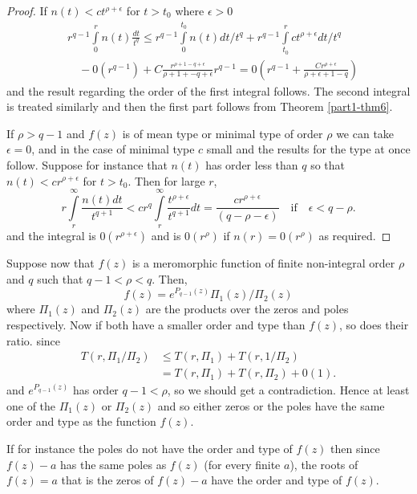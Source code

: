 \begin{proof}
If $n(t)<ct^{\rho+\epsilon}$ for $t> t_0$ where $\epsilon>0$
\begin{align*}
& r^{q-1}\int\limits^{r}_{0}n(t)\frac{dt}{t^{q}}\leq
  r^{q-1}\int\limits^{t_{0}}_{0}n(t)dt/t^{q}+r^{q-1}\int\limits^{r}_{t_{0}}ct^{\rho+\epsilon}dt/t^{q}\\
&\quad
  -0(r^{q-1})+C\frac{r^{\rho+1-q+\epsilon}}{\rho+1+-q+\epsilon}r^{q-1}=0\left(r^{q-1}+\frac{Cr^{\rho+\epsilon}}{\rho+\epsilon+1-q}\right)
\end{align*}\pageoriginale
and the result regarding the order of the first integral follows. The
second integral is treated similarly and then the first part follows
from Theorem \ref{part1-thm6}.

If $\rho>q-1$ and $f(z)$ is of mean type or minimal type of order
$\rho$ we can take $\epsilon=0$, and in the case of minimal type $c$
small and the results for the type at once follow. Suppose for
instance that $n(t)$ has order less than $q$ so that
$n(t)<cr^{\rho+\epsilon}$ for $t>t_{0}$. Then for large $r$,
$$
r\int\limits^{\infty}_{r}\frac{n(t)dt}{t^{q+1}} <
cr^{q}\int\limits^{\infty}_{r}\frac{t^{\rho+\epsilon}}{t^{q+1}}dt=\frac{cr^{\rho+\epsilon}}{(q-\rho-\epsilon)}\quad\text{if}\quad
\epsilon<q-\rho. 
$$
and the integral is $0(r^{\rho+\epsilon})$ and is $0(r^{\rho})$ if
$n(r)=0(r^{\rho})$ as required.
\end{proof}

Suppose now that $f(z)$ is a meromorphic function of finite
non-integral order $\rho$ and $q$ such that $q-1<\rho<q$. Then,
$$
f(z)=e^{P_{q-1}(z)}\Pi_{1}(z)/\Pi_{2}(z)
$$
where $\Pi_{1}(z)$ and $\Pi_{2}(z)$ are the products over the zeros
and poles respectively. Now if both have a smaller order and type than
$f(z)$, so does their ratio. since\pageoriginale
\begin{align*}
T(r,\Pi_{1}/\Pi_{2}) &\leq T(r,\Pi_{1})+T(r,1/\Pi_{2})\\
&= T(r,\Pi_{1})+T(r,\Pi_{2})+0(1).
\end{align*}
and $e^{P_{q-1}(z)}$ has order $q-1<\rho$, so we should get a
contradiction. Hence at least one of the $\Pi_{1}(z)$ or $\Pi_{2}(z)$
and so either zeros or the poles have the same order and type as the
function $f(z)$.
 
If for instance the poles do not have the order and type of $f(z)$
then since $f(z)-a$ has the same poles as $f(z)$ (for every finite
$a$), the roots of $f(z)=a$ that is the zeros of $f(z)-a$ have the
order and type of $f(z)$.

